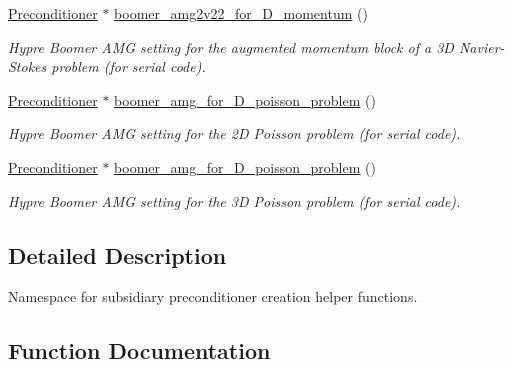 \begin{DoxyCompactItemize}
\hyperlink{classoomph_1_1Preconditioner}{Preconditioner} $\ast$ \hyperlink{namespaceoomph_1_1Lagrange__Enforced__Flow__Preconditioner__Subsidiary__Operator__Helper_aede595a2aa5c5a591cc2f31b6f109b89}{boomer\+\_\+amg2v22\+\_\+for\+\_\+D\+\_\+momentum} ()
\begin{DoxyCompactList}\small\item\em Hypre Boomer A\+MG setting for the augmented momentum block of a 3D Navier-\/\+Stokes problem (for serial code). \end{DoxyCompactList}\item 
\hyperlink{classoomph_1_1Preconditioner}{Preconditioner} $\ast$ \hyperlink{namespaceoomph_1_1Lagrange__Enforced__Flow__Preconditioner__Subsidiary__Operator__Helper_a79c7dcff04b79b203184452f2835f0fd}{boomer\+\_\+amg\+\_\+for\+\_\+D\+\_\+poisson\+\_\+problem} ()
\begin{DoxyCompactList}\small\item\em Hypre Boomer A\+MG setting for the 2D Poisson problem (for serial code). \end{DoxyCompactList}\item 
\hyperlink{classoomph_1_1Preconditioner}{Preconditioner} $\ast$ \hyperlink{namespaceoomph_1_1Lagrange__Enforced__Flow__Preconditioner__Subsidiary__Operator__Helper_a5a9bdc5c6ca31c52c123af6964e00d12}{boomer\+\_\+amg\+\_\+for\+\_\+D\+\_\+poisson\+\_\+problem} ()
\begin{DoxyCompactList}\small\item\em Hypre Boomer A\+MG setting for the 3D Poisson problem (for serial code). \end{DoxyCompactList}\end{DoxyCompactItemize}


\subsection{Detailed Description}
Namespace for subsidiary preconditioner creation helper functions. 

\subsection{Function Documentation}
\mbox{\label{namespaceoomph_1_1Lagrange__Enforced__Flow__Preconditioner__Subsidiary__Operator__Helper_aede595a2aa5c5a591cc2f31b6f109b89}} 
